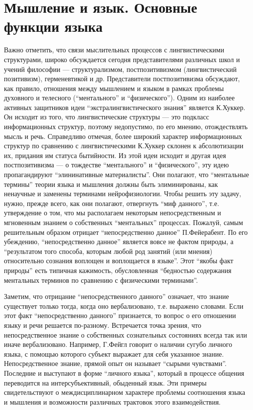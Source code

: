 \documentclass[12pt]{article}
\begin{document}
\section{Мышление и язык. Основные функции языка}
Важно отметить, что связи мыслительных процессов с лингвистическими структурами, широко обсуждается
сегодня  представителями  различных  школ  и  учений  философии --- структурализмом,   постпозитивизмом
(лингвистический позитивизм), герменевтикой и др. Представители постпозитивизма обсуждают, как правило,
отношения  между  мышлением  и  языком  в  рамках  проблемы  духовного  и  телесного  (“ментального”  и
“физического”).  Одним  из  наиболее  активных  защитников  идеи  “экстралингвистического  знания”  является
К.Хуккер.  Он  исходит  из  того,  что  лингвистические  структуры --- это  подкласс  информационных  структур,
поэтому недопустимо, по его мнению, отождествлять мысль и речь. Справедливо отмечая, более широкий
характер информационных структур по сравнению с лингвистическими К.Хуккер склонен к абсолютизации их,
придания  им  статуса  бытийности.  Из  этой  идеи  исходит  и  другая  идея  постпозитивизма --- о  тождестве
“ментального” и “физического”, эту идею пропагандируют  “элининативные материалисты”. Они полагают,
что “ментальные термины” теории языка и мышления должны быть элиминированы, как ненаучные и заменены
терминами нейрофизиологии. Чтобы решить эту задачу, нужно, прежде всего, как они полагают, отвергнуть
“миф  данного”,  т.е.  утверждение  о  том,  что  мы  располагаем  некоторым  непосредственным  и  мгновенным
знанием  о  собственных  “ментальных”  процессах.  Пожалуй,  самым   решительным  образом  отрицает
“непосредственно  данное”  П.Фейерабент.  По  его  убеждению, “непосредственно  данное”  является  вовсе не
фактом природы, а “результатом того способа, которым любой род занятий (или мнения) относительно сознания
воплощен  и  воплощается  в  языке”.  Этот  “якобы  факт  природы”  есть  типичная  кажимость,  обусловленная
“бедностью содержания ментальных терминов по сравнению с физическими терминами”.

Заметим, что отрицание “непосредственного данного” означает, что знание существует только тогда, когда оно
вербализовано, т.е. выражено словами. Если этот факт “непосредственно данного” признается, то вопрос о его
отношении  языку  и  речи  решается  по-разному.  Встречается  точка  зрения,  что  непосредственное  знание  о
собственных сознательных состояниях всегда так или иначе вербализовано.  Например, Г.Фейгл говорит о
наличии  сугубо  личного  языка,  с  помощью  которого  субъект  выражает  для  себя  указанное  знание.
Непосредственное знание, прямой опыт он называет “сырыми чувствами”. Последние и выступают в форме
“личного  языка”,  который  в  процессе  общения  переводится  на  интерсубъективный,  обыденный  язык.  Эти
примеры  свидетельствуют  о  междисциплинарном  характере  проблемы  соотношения  языка  и  мышления  и
возможности различных трактовок этого взаимодействия.
\end{document}
